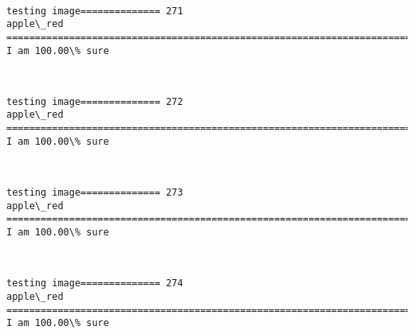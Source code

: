 \documentclass[11pt]{article}
\begin{document}
    \begin{center}
    \end{center}
    { \hspace*{\fill} \\}
    
    \begin{Verbatim}[commandchars=\\\{\}]
testing image============== 271
apple\_red
============================================================================
I am 100.00\% sure

    \end{Verbatim}

    \begin{center}
    \end{center}
    { \hspace*{\fill} \\}
    
    \begin{Verbatim}[commandchars=\\\{\}]
testing image============== 272
apple\_red
============================================================================
I am 100.00\% sure

    \end{Verbatim}

    \begin{center}
    \end{center}
    { \hspace*{\fill} \\}
    
    \begin{Verbatim}[commandchars=\\\{\}]
testing image============== 273
apple\_red
============================================================================
I am 100.00\% sure

    \end{Verbatim}

    \begin{center}
    \end{center}
    { \hspace*{\fill} \\}
    
    \begin{Verbatim}[commandchars=\\\{\}]
testing image============== 274
apple\_red
============================================================================
I am 100.00\% sure

    \end{Verbatim}
\end{document}
